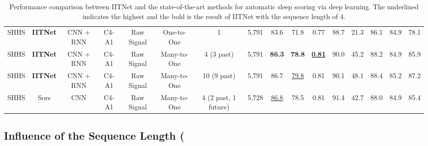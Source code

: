 \documentclass[10pt,twocolumn,twoside]{IEEEtran}
\begin{document}
\begin{table*}[ht!]
\begin{tabular}{@{}cccccccccccccccc@{}}
        \cmidrule(r){1-8} \cmidrule(r){9-11} \cmidrule{12-16} \\ [-0.5em]
        SHHS & \textbf{IITNet} & CNN + RNN & C4-A1 & Raw Signal & One-to-One & 1 & 5,791 & 83.6 & 71.8 & 0.77 & 88.7 & 21.3 & 86.1 & 84.9 & 78.1 \\ [0.7em]
        SHHS & \textbf{IITNet} & CNN + RNN & C4-A1 & Raw Signal & Many-to-One & 4 (3 past) & 5,791 & \textbf{86.3} & \textbf{78.8} & \underline{\textbf{0.81}} & 90.0 & 45.2 & 88.2 & 84.9 & 85.9 \\ [0.7em]
        SHHS & \textbf{IITNet} & CNN + RNN & C4-A1 & Raw Signal & Many-to-One & 10 (9 past) & 5,791 & 86.7 & \underline{79.8} & 0.81 & 90.1 & 48.1 & 88.4 & 85.2 & 87.2 \\ [0.7em]
        SHHS & Sors \cite{sors2018convolutional} & CNN & C4-A1 & Raw Signal & Many-to-One & 4 (2 past, 1 future) & 5,728 & \underline{86.8} & 78.5 & 0.81 & 91.4 & 42.7 & 88.0 & 84.9 & 85.4 \\ [0.7em]
        \bottomrule
     \end{tabular}

     \caption{Performance comparison between IITNet and the state-of-the-art methods for automatic sleep scoring via deep learning. The underlined indicates the highest and the bold is the result of IITNet with the sequence length of 4.}
     \label{table:SOTA}
     \end{table*}

    \subsection{Influence of the Sequence Length (}
    
\end{document}
